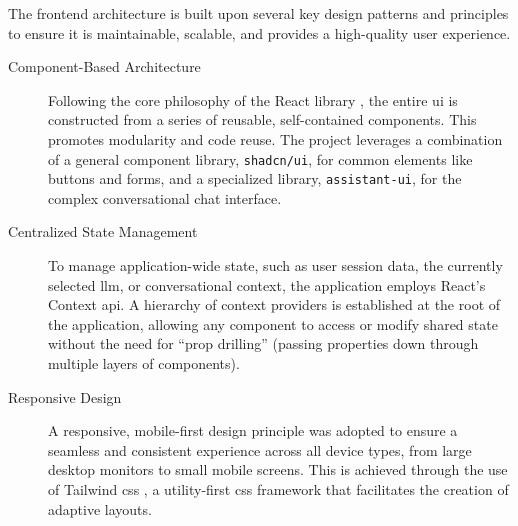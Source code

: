 The frontend architecture is built upon several key design patterns and principles to ensure it is maintainable, scalable, and provides a high-quality user experience.

\begin{description}
    \item[Component-Based Architecture] Following the core philosophy of the React library \cite{REACT}, the entire \acs{ui} is constructed from a series of reusable, self-contained components. This promotes modularity and code reuse. The project leverages a combination of a general component library, \texttt{shadcn/ui}, for common elements like buttons and forms, and a specialized library, \texttt{assistant-ui}, for the complex conversational chat interface.

    \item[Centralized State Management] To manage application-wide state, such as user session data, the currently selected \ac{llm}, or conversational context, the application employs React's Context \acs{api}. A hierarchy of context providers is established at the root of the application, allowing any component to access or modify shared state without the need for ``prop drilling'' (passing properties down through multiple layers of components).

    \item[Responsive Design] A responsive, mobile-first design principle was adopted to ensure a seamless and consistent experience across all device types, from large desktop monitors to small mobile screens. This is achieved through the use of Tailwind \acs{css} \cite{TAILWIND-CSS}, a utility-first \ac{css} framework that facilitates the creation of adaptive layouts.
\end{description}
